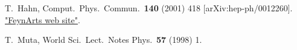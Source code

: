 \begin{thebibliography}{99}
T.~Hahn,
Comput.\ Phys.\ Commun.\  {\bf 140} (2001) 418
[arXiv:hep-ph/0012260].
\href{http://www.feynarts.de/}{"FeynArts web site"}.

T.~Muta,
World Sci.\ Lect.\ Notes Phys.\  {\bf 57} (1998) 1.

\end{thebibliography}

